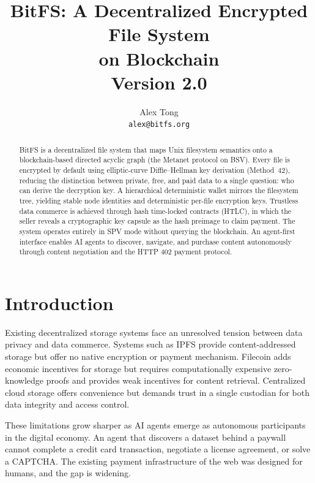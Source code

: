 \documentclass[11pt,a4paper]{article}
\title{%
  \vspace{-1cm}
  \textbf{\LARGE BitFS: A Decentralized Encrypted File System\\on Blockchain}\\[0.5em]
  \large Version 2.0
}
\author{Alex Tong\\[0.3em]\texttt{alex@bitfs.org}}
\date{}
\begin{document}
\maketitle
\thispagestyle{fancy}

\begin{abstract}
BitFS is a decentralized file system that maps Unix filesystem semantics onto a blockchain-based directed acyclic graph (the Metanet protocol on BSV). Every file is encrypted by default using elliptic-curve Diffie--Hellman key derivation (Method~42), reducing the distinction between private, free, and paid data to a single question: who can derive the decryption key. A hierarchical deterministic wallet mirrors the filesystem tree, yielding stable node identities and deterministic per-file encryption keys. Trustless data commerce is achieved through hash time-locked contracts (HTLC), in which the seller reveals a cryptographic key capsule as the hash preimage to claim payment. The system operates entirely in SPV mode without querying the blockchain. An agent-first interface enables AI agents to discover, navigate, and purchase content autonomously through content negotiation and the HTTP 402 payment protocol.
\end{abstract}

\vspace{1em}
\tableofcontents
\vspace{1em}

\section{Introduction}

Existing decentralized storage systems face an unresolved tension between data privacy and data commerce. Systems such as IPFS provide content-addressed storage but offer no native encryption or payment mechanism. Filecoin adds economic incentives for storage but requires computationally expensive zero-knowledge proofs and provides weak incentives for content retrieval. Centralized cloud storage offers convenience but demands trust in a single custodian for both data integrity and access control.

These limitations grow sharper as AI agents emerge as autonomous participants in the digital economy. An agent that discovers a dataset behind a paywall cannot complete a credit card transaction, negotiate a license agreement, or solve a CAPTCHA. The existing payment infrastructure of the web was designed for humans, and the gap is widening.
\end{document}
